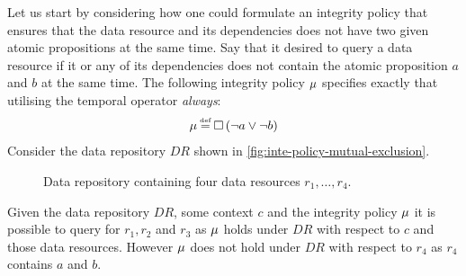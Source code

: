 \begin{example}[]\label{ex:mutual-exclusion}
Let us start by considering how one could formulate an integrity policy that ensures that the data resource and its dependencies does not have two given atomic propositions at the same time. Say that it desired to query a data resource if it or any of its dependencies does not contain the atomic proposition $a$ and $b$ at the same time. The following integrity policy $\mu$ specifies exactly that utilising the temporal operator \emph{always}:
\begin{align*}
    \inte \eqdef  \G \left( \lnot a \lor \lnot b \right)
\end{align*}
Consider the data repository $DR$ shown in \autoref{fig:inte-policy-mutual-exclusion}.
\begin{figure}[!ht]
    \begin{center}
        
        \caption{Data repository containing four data resources $r_1, \ldots, r_4$.}
        \label{fig:inte-policy-mutual-exclusion}
    \end{center}
\end{figure}
Given the data repository $DR$, some context $c$ and the integrity policy $\mu$ it is possible to query for $r_1, r_2$ and $r_3$ as $\mu$ holds under $DR$ with respect to $c$ and those data resources. However $\mu$ does not hold under $DR$ with respect to $r_4$ as $r_4$ contains $a$ and $b$.
\end{example}

